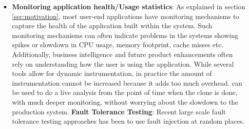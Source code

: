 \begin{itemize}[leftmargin=*,topsep=0pt,itemsep=-1ex,partopsep=1ex,parsep=1ex]
\item \textbf{Monitoring application health/Usage statistics}: 
As explained in section \ref{sec:motivation}, most user-end applications have monitoring mechanisms to capture the health of the application built within the system.
Such monitoring mechanisms can often indicate problems in the systems showing spikes or slowdown in CPU usage, memory footprint, cache misses etc.
Additionally, business intelligence and future product enhancements often rely on understanding how the user is using the application.
While several tools allow for dynamic instrumentation, in practice the amount of instrumentation cannot be increased because it adds too much overhead.
\parikshan can be used to do a live analysis from the point of time when the clone is done, with much deeper monitoring, without worrying about the slowdown to the production system.
\iffalse
\textbf{Fault Tolerance Testing}: 
Recent large scale fault tolerance testing approaches has been to use fault injection at random places.

\end{itemize}
